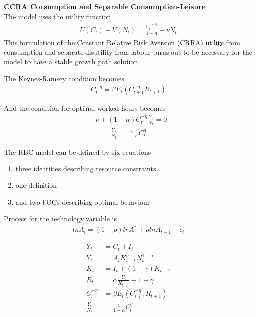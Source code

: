 \documentclass{beamer}
\begin{document}
\begin{frame}
  \textbf{CCRA Consumption and Separable Consumption-Leisure}\\
  The model uses the utility function
  \begin{align}
  U(C_t)-V(N_t)=\frac{C_t^{1-\eta}}{1-\eta}-\nu N_t
  \end{align}
  This formulation of the Constant Relative Risk Aversion (CRRA) utility from consumption and separate disutility from labour turns out to be necessary for the model to have a stable growth path solution.
\end{frame}

\begin{frame}
  The Keynes-Ramsey condition becomes
\begin{align}
  C^{-\eta}_t=\beta E_t(C^{-\eta}_{t+1}R_{t+1})
\end{align}

And the condition for optimal worked hours becomes
\begin{align}
  -\nu +(1-\alpha)C^{-\eta}_t \frac{Y_t}{N_t} = 0
\end{align}
\begin{align}
  \frac{Y_t}{N_t} = \frac{v}{1-\alpha}C_t^{\eta}
\end{align}
\end{frame}


\begin{frame}
  The RBC model can be defined by six equations
\begin{enumerate}
  \item three identities describing resource constraints
  \item one definition
  \item and two FOCs describing optimal behaviour
\end{enumerate}
Process for the technology variable is \begin{align}
  ln A_t = (1-\rho) ln A^* + \rho ln A_{t-1} + \epsilon_t
\end{align}
\end{frame}

\begin{frame}
\begin{align}
  Y_t &= C_t +I_t\\
  Y_t &= A_tK^{\alpha}_{t-1}N^{1-\alpha}_t\\
  K_t &= I_t+(1-\gamma)K_{t-1}\\
  R_t &= \alpha \frac{Y_t}{K_{t-1}}+1-\gamma\\
  C^{-\eta}_t &= \beta E_t(C^{-\eta}_{t+1}R_{t+1})\\
  \frac{Y_t}{N_t} &= \frac{v}{1-\alpha}C^{\eta}_t
\end{align}
\end{frame}
\end{document}
